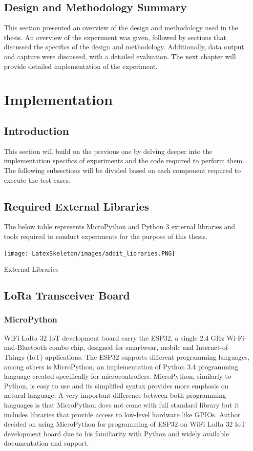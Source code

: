 \documentclass[oneside,12pt]{book}
\begin{document}
 \section{Design and Methodology Summary}
 This section presented an overview of the design and methodology used in the thesis. An overview of the experiment was given, followed by sections that discussed the specifics of the design and methodology. Additionally, data output and capture were discussed, with a detailed evaluation. The next chapter will provide detailed implementation of the experiment.  
\chapter{Implementation}
\section{Introduction}
This section will build on the previous one by delving deeper into the implementation specifics of experiments and the code required to perform them. The following subsections will be divided based on each component required to execute the test cases.
\section{Required External Libraries}
The below table represents MicroPython and Python 3 external libraries and tools required to conduct experiments for the purpose of this thesis.
\begin{table}[H]
  \centering
  \label{tbl:External Libraries}
  \texttt{[image: LatexSkeleton/images/addit\_libraries.PNG]}
  \caption{External Libraries }
\end{table}
\section{LoRa Transceiver Board}
\subsection{MicroPython}
WiFi LoRa 32 IoT development board carry the ESP32, a single 2.4 GHz Wi-Fi-and-Bluetooth combo chip, designed for smartwear, mobile and Internet-of-Things (IoT) applications. The ESP32 supports different programming languages, among others is MicroPython, an implementation of Python 3.4 programming language created specifically for microcontrollers. MicroPython, similarly to Python, is easy to use and its  simplified syntax provides more emphasis on natural language. A very important difference between both programming languages is that MicroPython does not come with full standard library but it includes libraries that provide access to low-level hardware like GPIOs. Author decided on using MicroPython for programming of ESP32 on WiFi LoRa 32 IoT development board due to his familiarity with Python and widely available documentation and support.
\end{document}
